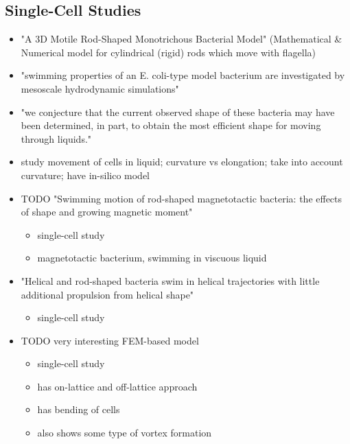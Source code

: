 \subsection{Single-Cell Studies}
\begin{itemize}
    \item \cite{Hsu2009} "A 3D Motile Rod-Shaped Monotrichous Bacterial Model" (Mathematical \&
        Numerical model for cylindrical (rigid) rods which move with flagella)
    \item \cite{Hu2015} "swimming properties of an E. coli-type model bacterium are investigated by
        mesoscale hydrodynamic simulations"
    \item \cite{Cooper2006} "we conjecture that the current observed shape of these bacteria may
        have been determined, in part, to obtain the most efficient shape for moving
        through liquids."
    \item \cite{Schuech2019} study movement of cells in liquid; curvature vs elongation;
        take into account curvature; have in-silico model
    \item \cite{Kong2014} TODO "Swimming motion of rod-shaped magnetotactic bacteria: the effects of
        shape and growing magnetic moment"
        \begin{itemize}
            \item single-cell study
            \item magnetotactic bacterium, swimming in viscuous liquid
        \end{itemize}
    \item \cite{Constantino2016} "Helical and rod-shaped bacteria swim in helical trajectories with
        little additional propulsion from helical shape"
        \begin{itemize}
            \item single-cell study
        \end{itemize}
    \item \cite{Starru2007} TODO very interesting FEM-based model
        \begin{itemize}
            \item single-cell study
            \item has on-lattice and off-lattice approach
            \item has bending of cells
            \item also shows some type of vortex formation
        \end{itemize}
\end{itemize}

